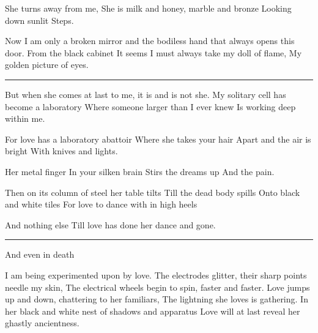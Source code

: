 \documentclass[english,11pt,letterpaper,onecolumn]{scrbook}
\begin{document}
\begin{poem}
\begin{stanza}
She turns away from me,\verseline
She is milk and honey, marble and bronze\verseline
Looking down sunlit\verseline
Steps.
\end{stanza}

\begin{stanza}
Now I am only a broken mirror and the bodiless hand that always opens this door.\verseline
From the black cabinet \verseline
It seems I must always take my doll of flame,\verseline
My golden picture of eyes.
\end{stanza}

\begin{center}\rule[3pt]{2in}{0.5pt}\end{center}

\begin{stanza}
But when she comes at last to me, it is and is not she.\verseline
My solitary cell has become a laboratory\verseline
Where someone larger than I ever knew \verseline
Is working deep within me.
\end{stanza}

\begin{stanza}
For love has a laboratory abattoir\verseline
Where she takes your hair\verseline
Apart and the air is bright\verseline
With knives and lights.
\end{stanza}

\begin{stanza}
Her metal finger \verseline
In your silken brain\verseline
Stirs the dreams up \verseline
And the pain.
\end{stanza}

\begin{stanza}
Then on its column of steel her table tilts\verseline
Till the dead body spills \verseline
Onto black and white tiles\verseline
For love to dance with in high heels 
\end{stanza}

\begin{stanza}
And nothing else\verseline
Till love has done her dance and gone.
\end{stanza}

\begin{center}\rule[3pt]{2in}{0.5pt}\end{center}

\begin{stanza}
And even in death 
\end{stanza}

\begin{stanza}
I am being experimented upon by love.\verseline
The electrodes glitter, their sharp points needle my skin,\verseline
The electrical wheels begin to spin, faster and faster.\verseline
Love jumps up and down, chattering to her familiars,\verseline
The lightning she loves is gathering.\verseline
In her black and white nest of shadows and apparatus\verseline
Love will at last reveal her ghastly ancientness.
\end{stanza}


\end{poem}
\end{document}
